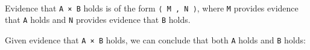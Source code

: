 \begin{fence}
\begin{code}%
\>[0]\AgdaSpace{}%
\AgdaSpace{}%
\AgdaSymbol{(}\AgdaSpace{}%
\AgdaSpace{}%
\AgdaSymbol{:}\AgdaSpace{}%
\AgdaSymbol{)}\AgdaSpace{}%
\AgdaSymbol{:}\AgdaSpace{}%
\AgdaSpace{}%
\<%
\\
%
\\[\AgdaEmptyExtraSkip]%
\>[0][@{}l@{\AgdaIndent{0}}]%
\>[2]\AgdaSpace{}%
\AgdaSymbol{:}\<%
\\
\>[2][@{}l@{\AgdaIndent{0}}]%
\>[6]\<%
\\
\>[2][@{}l@{\AgdaIndent{0}}]%
\>[4]%
\>[34I]\<%
\\
\>[.][@{}l@{}]\<[34I]%
\>[6]\AgdaComment{-----}\<%
\\
%
\>[4]\AgdaSpace{}%
\AgdaSpace{}%
\AgdaSpace{}%
\<%
\end{code}
\end{fence}

Evidence that \texttt{A\ ×\ B} holds is of the form
\texttt{⟨\ M\ ,\ N\ ⟩}, where \texttt{M} provides evidence that
\texttt{A} holds and \texttt{N} provides evidence that \texttt{B} holds.

Given evidence that \texttt{A\ ×\ B} holds, we can conclude that both
\texttt{A} holds and \texttt{B} holds:

